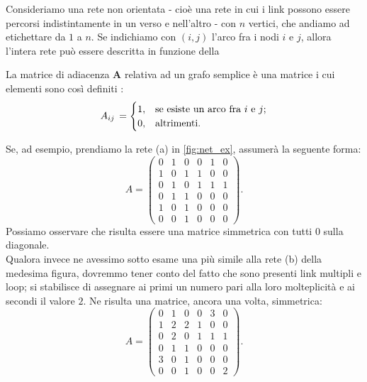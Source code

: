Consideriamo una rete non orientata - cioè una rete in cui i link possono essere percorsi indistintamente in un verso e nell'altro - con $ n $ vertici, che andiamo ad etichettare da $ 1 $ a $ n $. Se indichiamo con $ \left( i, j \right) $ l'arco fra i nodi $ i $ e $ j $, allora l'intera rete può essere descritta in funzione della
\begin{definizione}
La matrice di adiacenza \textbf{A} relativa ad un grafo semplice è una matrice i cui elementi sono così definiti \cite{Newman}:
\[
A_{ij} \, =
\begin{cases}
1, & \text{se esiste un arco fra $ i $ e $ j $};\\ 
0, & \text{altrimenti}.
\end{cases}
\]
\end{definizione}
Se, ad esempio, prendiamo la rete (a) in \cref{fig:net_ex}, assumerà la seguente forma:
\begin{equation}
A =
\begin{pmatrix}
0 & 1 & 0 & 0 & 1 & 0 \\
1 & 0 & 1 & 1 & 0 & 0 \\
0 & 1 & 0 & 1 & 1 & 1 \\
0 & 1 & 1 & 0 & 0 & 0 \\
1 & 0 & 1 & 0 & 0 & 0 \\
0 & 0 & 1 & 0 & 0 & 0
\end{pmatrix} .
\end{equation}
Possiamo osservare che risulta essere una matrice simmetrica con tutti $ 0 $ sulla diagonale. 
\\Qualora invece ne avessimo sotto esame una più simile alla rete (b) della medesima figura, dovremmo tener conto del fatto che sono presenti link multipli e loop; si stabilisce di assegnare ai primi un numero pari alla loro molteplicità e ai secondi il valore $ 2 $. Ne risulta una matrice, ancora una volta, simmetrica:
\begin{equation}
A =
\begin{pmatrix}
0 & 1 & 0 & 0 & 3 & 0 \\
1 & 2 & 2 & 1 & 0 & 0 \\
0 & 2 & 0 & 1 & 1 & 1 \\
0 & 1 & 1 & 0 & 0 & 0 \\
3 & 0 & 1 & 0 & 0 & 0 \\
0 & 0 & 1 & 0 & 0 & 2
\end{pmatrix} .
\end{equation}

